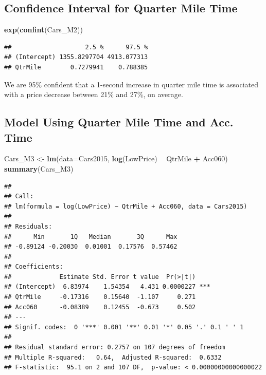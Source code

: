 \documentclass[]{book}
\newenvironment{Shaded}{\begin{snugshade}}{\end{snugshade}}
\newcommand{\KeywordTok}[1]{\textcolor[rgb]{0.13,0.29,0.53}{\textbf{#1}}}
\newcommand{\DataTypeTok}[1]{\textcolor[rgb]{0.13,0.29,0.53}{#1}}
\newcommand{\StringTok}[1]{\textcolor[rgb]{0.31,0.60,0.02}{#1}}
\newcommand{\OperatorTok}[1]{\textcolor[rgb]{0.81,0.36,0.00}{\textbf{#1}}}
\newcommand{\NormalTok}[1]{#1}
\begin{document}
\subsection{Confidence Interval for Quarter Mile
Time}\label{confidence-interval-for-quarter-mile-time}

\begin{Shaded}
\begin{Highlighting}[]
\KeywordTok{exp}\NormalTok{(}\KeywordTok{confint}\NormalTok{(Cars_M2))}
\end{Highlighting}
\end{Shaded}

\begin{verbatim}
##                    2.5 %      97.5 %
## (Intercept) 1355.8297704 4913.077313
## QtrMile        0.7279941    0.788385
\end{verbatim}

We are 95\% confident that a 1-second increase in quarter mile time is
associated with a price decrease between 21\% and 27\%, on average.

\subsection{Model Using Quarter Mile Time and Acc.
Time}\label{model-using-quarter-mile-time-and-acc.-time}

\begin{Shaded}
\begin{Highlighting}[]
\NormalTok{Cars_M3 <-}\StringTok{ }\KeywordTok{lm}\NormalTok{(}\DataTypeTok{data=}\NormalTok{Cars2015, }\KeywordTok{log}\NormalTok{(LowPrice) }\OperatorTok{~}\StringTok{ }\NormalTok{QtrMile }\OperatorTok{+}\StringTok{ }\NormalTok{Acc060)}
\KeywordTok{summary}\NormalTok{(Cars_M3)}
\end{Highlighting}
\end{Shaded}

\begin{verbatim}
## 
## Call:
## lm(formula = log(LowPrice) ~ QtrMile + Acc060, data = Cars2015)
## 
## Residuals:
##      Min       1Q   Median       3Q      Max 
## -0.89124 -0.20030  0.01001  0.17576  0.57462 
## 
## Coefficients:
##             Estimate Std. Error t value  Pr(>|t|)    
## (Intercept)  6.83974    1.54354   4.431 0.0000227 ***
## QtrMile     -0.17316    0.15640  -1.107     0.271    
## Acc060      -0.08389    0.12455  -0.673     0.502    
## ---
## Signif. codes:  0 '***' 0.001 '**' 0.01 '*' 0.05 '.' 0.1 ' ' 1
## 
## Residual standard error: 0.2757 on 107 degrees of freedom
## Multiple R-squared:   0.64,  Adjusted R-squared:  0.6332 
## F-statistic:  95.1 on 2 and 107 DF,  p-value: < 0.00000000000000022
\end{verbatim}
\end{document}
